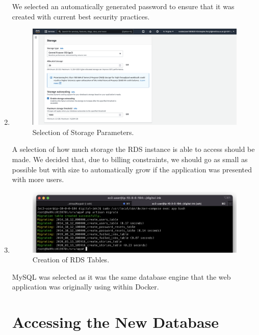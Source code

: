 \begin{enumerate}
    We selected an automatically generated password to ensure that it was created with current best security practices.

    \item
    \begin{figure}[H]
        \centering
        \includegraphics[width=\textwidth]{resources/rds/rds-storage}
        \caption{Selection of Storage Parameters.}
        \label{fig:rds-storage}
    \end{figure}

    A selection of how much storage the RDS instance is able to access should be made.
    We decided that, due to billing constraints, we should go as small as possible but with size to automatically grow if
    the application was presented with more users.

    \item
    \begin{figure}[H]
        \centering
        \includegraphics[width=\textwidth]{resources/rds/rds-tables-creation}
        \caption{Creation of RDS Tables.}
        \label{fig:rds-tables}
    \end{figure}




    MySQL was selected as it was the same database engine that the web application was originally using within Docker.

    \section{Accessing the New Database}\label{sec:accessing-the-new-database}


\end{enumerate}
